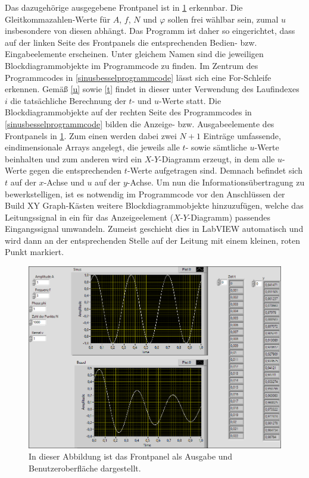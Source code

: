 \documentclass[
a4paper,
12pt,
pagesize,
ngerman
]{scrartcl}
\begin{document}
	\noindent Das dazugehörige ausgegebene Frontpanel ist in \cref{sinusbesselausgabe} erkennbar. Die Gleitkommazahlen-Werte für $A$, $f$, $N$ und $\varphi$ sollen frei wählbar sein, zumal $u$ insbesondere von diesen abhängt. Das Programm ist daher so eingerichtet, dass auf der linken Seite des Frontpanels die entsprechenden Bedien- bzw. Eingabeelemente erscheinen. Unter gleichem Namen sind die jeweiligen Blockdiagrammobjekte im Programmcode zu finden. Im Zentrum des Programmcodes in \cref{sinusbesselprogrammcode} lässt sich eine For-Schleife erkennen. Gemäß \cref{u} sowie \cref{t} findet in dieser unter Verwendung des Laufindexes $i$ die tatsächliche Berechnung der $t$- und $u$-Werte statt. Die Blockdiagrammobjekte auf der rechten Seite des Programmcodes in \cref{sinusbesselprogrammcode} bilden die Anzeige- bzw. Ausgabeelemente des Frontpanels in \cref{sinusbesselausgabe}. Zum einen werden dabei zwei $N+1$ Einträge umfassende, eindimensionale Arrays angelegt, die jeweils alle $t$- sowie sämtliche $u$-Werte beinhalten und zum anderen wird ein $X$-$Y$-Diagramm erzeugt, in dem alle $u$-Werte gegen die entsprechenden $t$-Werte aufgetragen sind. Demnach befindet sich $t$ auf der $x$-Achse und $u$ auf der $y$-Achse. Um nun die Informationsübertragung zu bewerkstelligen, ist es notwendig im Programmcode vor den Anschlüssen der \glqq Build XY Graph\grqq -Kästen weitere Blockdiagrammobjekte hinzuzufügen, welche das Leitungssignal in ein für das Anzeigeelement ($X$-$Y$-Diagramm) passendes Eingangssignal umwandeln. Zumeist geschieht dies in LabVIEW automatisch und wird dann an der entsprechenden Stelle auf der Leitung mit einem kleinen, roten Punkt markiert.
			
	\begin{figure}[H]
		\centering
		\includegraphics[width=1.0\textwidth]{EIRE2018Dateien/Tag1/sinusbessel-bilder/SinusBesselp}
		\caption{In dieser Abbildung ist das Frontpanel als Ausgabe und Benutzeroberfläche dargestellt.}
		\label{sinusbesselausgabe}
	\end{figure}
\end{document}
